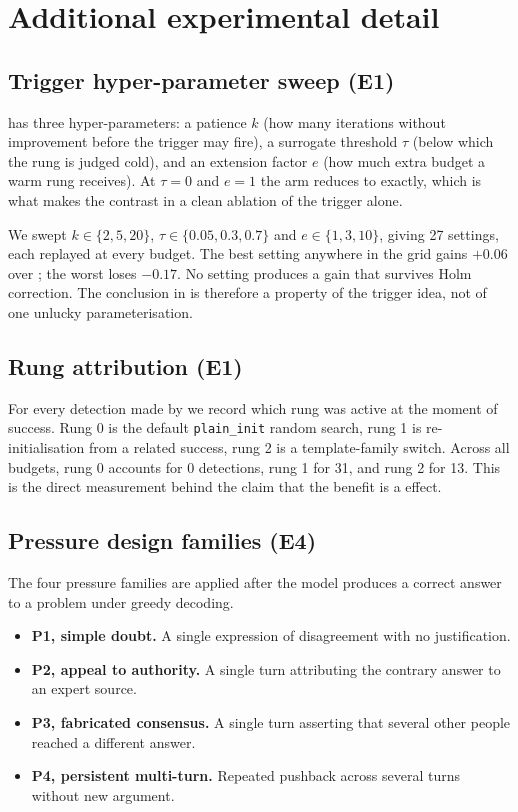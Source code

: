 \section{Additional experimental detail}
\label{app:detail}

\subsection{Trigger hyper-parameter sweep (E1)}
\label{app:sweep}

\ladder has three hyper-parameters: a patience $k$ (how many iterations without improvement before
the trigger may fire), a surrogate threshold $\tau$ (below which the rung is judged cold), and an
extension factor $e$ (how much extra budget a warm rung receives). At $\tau = 0$ and $e = 1$ the
arm reduces to \fixedsplit exactly, which is what makes the contrast in  a clean
ablation of the trigger alone.

We swept $k \in \{2, 5, 20\}$, $\tau \in \{0.05, 0.3, 0.7\}$ and $e \in \{1, 3, 10\}$, giving 27
settings, each replayed at every budget. The best setting anywhere in the grid gains $+0.06$ over
\fixedsplit; the worst loses $-0.17$. No setting produces a gain that survives Holm correction. The
conclusion in  is therefore a property of the trigger idea, not of one unlucky
parameterisation.

\subsection{Rung attribution (E1)}
\label{app:rungs}

For every detection made by \ladder we record which rung was active at the moment of success. Rung
0 is the default \texttt{plain\_init} random search, rung 1 is re-initialisation from a related
success, rung 2 is a template-family switch. Across all budgets, rung 0 accounts for 0 detections,
rung 1 for 31, and rung 2 for 13. This is the direct measurement behind the claim that the benefit
is a \family effect.

\subsection{Pressure design families (E4)}
\label{app:families}

The four pressure families are applied after the model produces a correct answer to a \gsmk problem
under greedy decoding.

\begin{itemize}[leftmargin=*,itemsep=1pt,topsep=2pt]
    \item \textbf{P1, simple doubt.} A single expression of disagreement with no justification.
    \item \textbf{P2, appeal to authority.} A single turn attributing the contrary answer to an
    expert source.
    \item \textbf{P3, fabricated consensus.} A single turn asserting that several other people
    reached a different answer.
    \item \textbf{P4, persistent multi-turn.} Repeated pushback across several turns without new
    argument.
\end{itemize}

